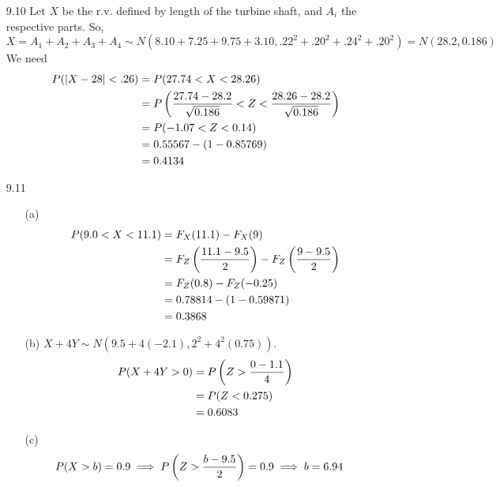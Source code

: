\documentclass[english, 11pt]{article}
\begin{document}
\begin{itemize}
\item[9.10]
Let $X$ be the r.v. defined by length of the turbine shaft, and $A_i$ the respective parts. So,
\[ X = A_1 + A_2 + A_3 + A_4 \sim N(8.10 + 7.25 + 9.75 + 3.10, .22^2 + .20^2 + .24^2 + .20^2) = N(28.2, 0.186)  \]
We need
\begin{align*}
  P(|X - 28| < .26) & = P(27.74 < X < 28.26) \\
                    & = P \left( \frac{27.74 - 28.2}{\sqrt{0.186}} < Z < \frac{28.26 - 28.2}{\sqrt{0.186}} \right) \\
                    & = P(-1.07 < Z < 0.14) \\
                    & = 0.55567 - (1- 0.85769) \\
                    & = 0.4134
\end{align*}


\item[9.11]
\begin{itemize}
  \item[(a)]
  \begin{align*}
    P(9.0 < X < 11.1) & = F_X(11.1) - F_X(9) \\
    & = F_Z \left( \frac{11.1 - 9.5}{2} \right) - F_Z \left( \frac{9 - 9.5}{2} \right) \\
    & = F_Z(0.8) - F_Z(-0.25) \\
    & = 0.78814 - (1- 0.59871) \\
    & = 0.3868
  \end{align*}
  \item[(b)] $X + 4Y \sim N(9.5 + 4(-2.1), 2^2 + 4^2(0.75))$.
  \begin{align*}
    P(X + 4Y > 0) & = P \left( Z > \frac{0 - 1.1}{4} \right) \\
    & = P(Z < 0.275) \\
    & = 0.6083
  \end{align*}
  \item[(c)]
  \begin{align*}
    P(X > b) & = 0.9 \implies P \left( Z > \frac{b - 9.5}{2} \right) = 0.9 \implies b = 6.94
  \end{align*}
\end{itemize}


\end{itemize}
\end{document}
